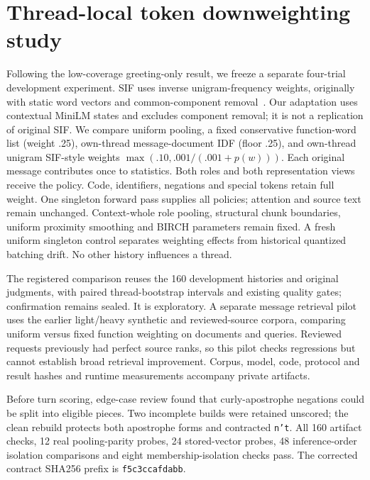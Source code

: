 \documentclass[11pt]{article}
\begin{document}
\section{Thread-local token downweighting study}
Following the low-coverage greeting-only result, we freeze a separate four-trial
development experiment. SIF uses inverse unigram-frequency weights, originally
with static word vectors and common-component removal~\cite{sif}. Our adaptation
uses contextual MiniLM states and excludes component removal; it is not a
replication of original SIF. We compare uniform pooling, a fixed conservative
function-word list (weight .25), own-thread message-document IDF (floor .25), and
own-thread unigram SIF-style weights $\max(.10,.001/(.001+p(w)))$.
Each original message contributes once to statistics. Both roles and both
representation views receive the policy. Code, identifiers, negations and
special tokens retain full weight. One singleton forward pass supplies all
policies; attention and source text remain unchanged. Context-whole role pooling,
structural chunk boundaries, uniform proximity smoothing and BIRCH parameters
remain fixed. A fresh uniform singleton control separates weighting effects from
historical quantized batching drift. No other history influences a thread.

The registered comparison reuses the 160 development histories and original
judgments, with paired thread-bootstrap intervals and existing quality gates;
confirmation remains sealed. It is exploratory. A separate message retrieval
pilot uses the earlier light/heavy synthetic and reviewed-source corpora, comparing
uniform versus fixed function weighting on documents and queries. Reviewed
requests previously had perfect source ranks, so this pilot checks regressions
but cannot establish broad retrieval improvement. Corpus, model, code, protocol
and result hashes and runtime measurements accompany private artifacts.

Before turn scoring, edge-case review found that curly-apostrophe negations could
be split into eligible pieces. Two incomplete builds were retained unscored;
the clean rebuild protects both apostrophe forms and contracted \texttt{n't}.
All 160 artifact checks, 12 real pooling-parity probes, 24 stored-vector probes,
48 inference-order isolation comparisons and eight membership-isolation checks
pass. The corrected contract SHA256 prefix is \texttt{f5c3ccafdabb}.
\end{document}
